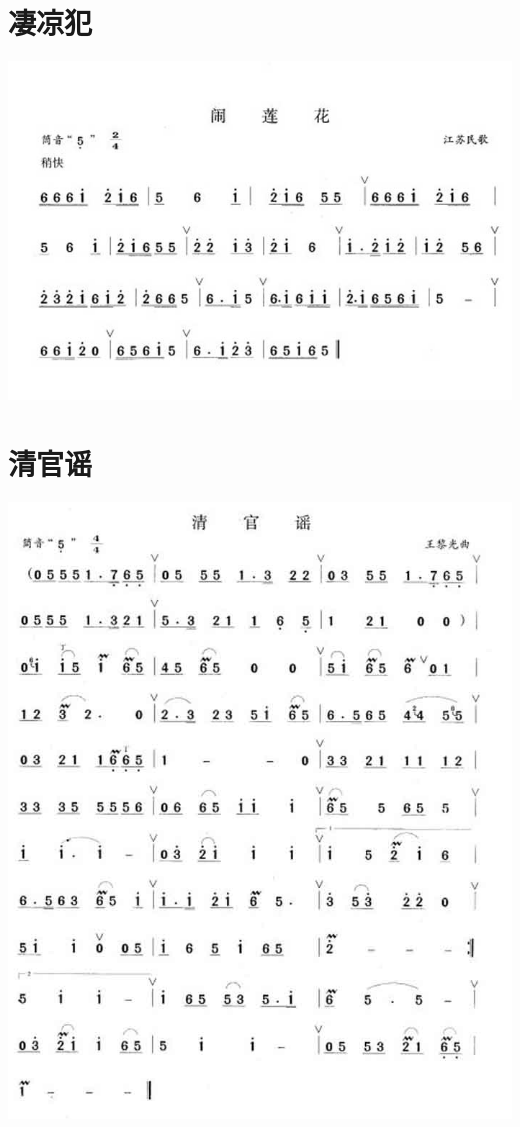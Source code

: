 \documentclass[cn,pad,chinese,chinesefont=nofont]{elegantbook}
\begin{document}
\section{凄凉犯}
    \includegraphics[width=\textwidth]{dongxiao/202003231858凄凉犯.jpg}
\section{清官谣}
    \includegraphics[width=\textwidth]{dongxiao/202003231858清官谣.jpg}
\end{document}
